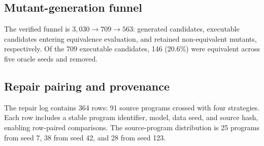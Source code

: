 \documentclass{article}
\begin{document}
\subsection{Mutant-generation funnel}
The verified funnel is $3{,}030 \rightarrow 709 \rightarrow 563$: generated candidates, executable candidates entering equivalence evaluation, and retained non-equivalent mutants, respectively. Of the 709 executable candidates, 146 (20.6\%) were equivalent across five oracle seeds and removed.

\subsection{Repair pairing and provenance}
The repair log contains 364 rows: 91 source programs crossed with four strategies. Each row includes a stable program identifier, model, data seed, and source hash, enabling row-paired comparisons. The source-program distribution is 25 programs from seed 7, 38 from seed 42, and 28 from seed 123.
\end{document}
